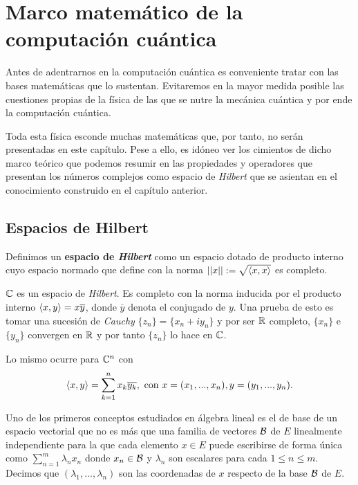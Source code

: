 \chapter{Marco matemático de la computación cuántica}

Antes de adentrarnos en la computación cuántica es conveniente tratar con las bases matemáticas que lo sustentan. Evitaremos en la mayor medida posible las cuestiones propias de la física de las que se nutre la mecánica cuántica y por ende la computación cuántica.

Toda esta física esconde muchas matemáticas que, por tanto, no serán presentadas en este capítulo. Pese a ello, es idóneo ver los cimientos de dicho marco teórico que podemos resumir en las propiedades y operadores que presentan los números complejos como espacio de \textit{Hilbert} que se asientan en el conocimiento construido en el capítulo anterior.

\section{Espacios de Hilbert}
\begin{definition} Definimos un \textbf{espacio de \textit{Hilbert}} como un espacio dotado de producto interno cuyo espacio normado que define con la norma $\left|\left|x\right|\right|:=\sqrt{\langle x,x\rangle}$ es completo.
\end{definition}

\begin{example} \label{ex:ex32} $\mathbb{C}$ es un espacio de \textit{Hilbert}. Es completo con la norma inducida por el producto interno $\langle x,y\rangle=x\overline{y}$, donde $\overline{y}$ denota el conjugado de $y$. Una prueba de esto es tomar una sucesión de \textit{Cauchy} $\{z_n\}=\{x_n+iy_n\}$ y por ser $\mathbb{R}$ completo, $\{x_n\}$ e $\{y_n\}$ convergen en $\mathbb{R}$ y por tanto $\{z_n\}$ lo hace en $\mathbb{C}$.

Lo mismo ocurre para $\mathbb{C}^n$ con
\begin{equation}\dotproduct{x}{y}=\sum^{n}_{k=1}x_k\overline{y_k},\mathrm{\ con\ } x=(x_1,...,x_n), y=(y_1,...,y_n).
\end{equation}
\end{example}

Uno de los primeros conceptos estudiados en álgebra lineal es el de base de un espacio vectorial que no es más que una familia de vectores $\mathcal{B}$ de $E$ linealmente independiente para la que cada elemento $x\in E$ puede escribirse de forma única como $\sum_{n=1}^m\lambda_nx_n$ donde $x_n\in\mathcal{B}$ y $\lambda_n$ son escalares para cada $1\leq n\leq m$. Decimos que $(\lambda_1,...,\lambda_n)$ son las coordenadas de $x$ respecto de la base $\mathcal{B}$ de $E$.

